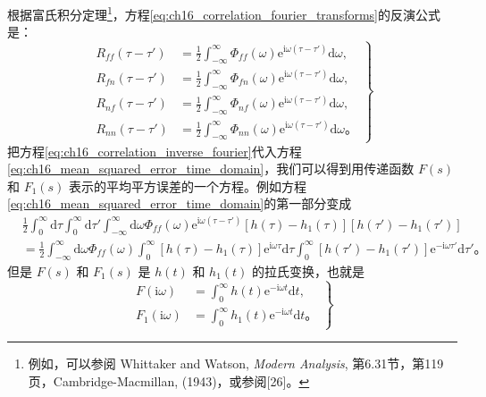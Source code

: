 根据富氏积分定理\footnote{例如，可以参阅 Whittaker and Watson, \textit{Modern Analysis}, 第6.31节，第119页，Cambridge-Macmillan, (1943)，或参阅[26]。}，方程\eqref{eq:ch16_correlation_fourier_transforms}的反演公式是：
\begin{equation}
\left.
\begin{aligned}
R_{ff}(\tau-\tau') &= \frac{1}{2}\int_{-\infty}^{\infty} \Phi_{ff}(\omega)\mathrm{e}^{\mathrm{i}\omega(\tau-\tau')}\mathrm{d}\omega, \\
R_{fn}(\tau-\tau') &= \frac{1}{2}\int_{-\infty}^{\infty} \Phi_{fn}(\omega)\mathrm{e}^{\mathrm{i}\omega(\tau-\tau')}\mathrm{d}\omega, \\
R_{nf}(\tau-\tau') &= \frac{1}{2}\int_{-\infty}^{\infty} \Phi_{nf}(\omega)\mathrm{e}^{\mathrm{i}\omega(\tau-\tau')}\mathrm{d}\omega, \\
R_{nn}(\tau-\tau') &= \frac{1}{2}\int_{-\infty}^{\infty} \Phi_{nn}(\omega)\mathrm{e}^{\mathrm{i}\omega(\tau-\tau')}\mathrm{d}\omega。
\end{aligned}
\right\}
\label{eq:ch16_correlation_inverse_fourier}
\end{equation}
把方程\eqref{eq:ch16_correlation_inverse_fourier}代入方程\eqref{eq:ch16_mean_squared_error_time_domain}，我们可以得到用传递函数 $F(s)$ 和 $F_1(s)$ 表示的平均平方误差的一个方程。例如方程\eqref{eq:ch16_mean_squared_error_time_domain}的第一部分变成
\begin{equation*}
\begin{aligned}
&\frac{1}{2}\int_{0}^{\infty}\mathrm{d}\tau\int_{0}^{\infty}\mathrm{d}\tau'\int_{-\infty}^{\infty}\mathrm{d}\omega\Phi_{ff}(\omega)\mathrm{e}^{\mathrm{i}\omega(\tau-\tau')}[h(\tau)-h_1(\tau)][h(\tau')-h_1(\tau')] \\
&= \frac{1}{2}\int_{-\infty}^{\infty}\mathrm{d}\omega\Phi_{ff}(\omega)\int_{0}^{\infty}[h(\tau)-h_1(\tau)]\mathrm{e}^{\mathrm{i}\omega\tau}\mathrm{d}\tau\int_{0}^{\infty}[h(\tau')-h_1(\tau')]\mathrm{e}^{-\mathrm{i}\omega\tau'}\mathrm{d}\tau'。
\end{aligned}
\end{equation*}
但是 $F(s)$ 和 $F_1(s)$ 是 $h(t)$ 和 $h_1(t)$ 的拉氏变换，也就是
\begin{equation}
\left.
\begin{aligned}
F(\mathrm{i}\omega) &= \int_{0}^{\infty} h(t)\mathrm{e}^{-\mathrm{i}\omega t}\mathrm{d}t, \\
F_1(\mathrm{i}\omega) &= \int_{0}^{\infty} h_1(t)\mathrm{e}^{-\mathrm{i}\omega t}\mathrm{d}t。
\end{aligned}
\right\}
\label{eq:ch16_transfer_function_frequency_response}
\end{equation}
